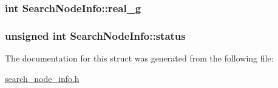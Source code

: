 \hypertarget{structSearchNodeInfo_acd8ef58c8ed2912745204729d02417d7}{
\subsubsection[{real\-\_\-g}]{\setlength{\rightskip}{0pt plus 5cm}int Search\-Node\-Info\-::real\-\_\-g}}\label{structSearchNodeInfo_acd8ef58c8ed2912745204729d02417d7}
\hypertarget{structSearchNodeInfo_ad59aab13c817bc5fa13b09fcfaef6e36}{
\subsubsection[{status}]{\setlength{\rightskip}{0pt plus 5cm}unsigned int Search\-Node\-Info\-::status}}\label{structSearchNodeInfo_ad59aab13c817bc5fa13b09fcfaef6e36}


The documentation for this struct was generated from the following file\-:\begin{DoxyCompactItemize}
\item 
\hyperlink{search__node__info_8h}{search\-\_\-node\-\_\-info.\-h}\end{DoxyCompactItemize}

